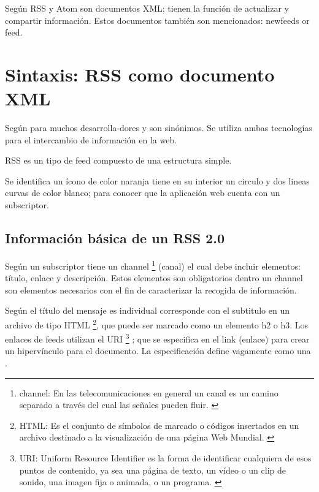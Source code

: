 Según \cite{wittenbrink2005rss} RSS y Atom son documentos XML; tienen la
función de actualizar y compartir información. Estos documentos también son
mencionados: newfeeds or feed. 

\section{Sintaxis: RSS como documento XML}

Según \cite{wittenbrink2005rss} para muchos desarrolla-dores
 y  son sinónimos. Se utiliza ambas
tecnologías para el intercambio de información en la web.

RSS es un tipo de feed compuesto de una estructura simple.

Se identifica un ícono de color naranja tiene en su interior un circulo 
y dos lineas curvas de color blanco; para conocer que la aplicación web 
cuenta con un subscriptor.

\begin{minipage}{1.0\linewidth}
	\centering
	\label{Ícono representación gráfica de un feed}
\end{minipage}

\subsection{Información básica de un RSS 2.0}

Según \cite{wittenbrink2005rss} un subscriptor tiene un channel
\footnote{channel: En las telecomunicaciones en general un canal es un camino
separado a través del cual las señales pueden fluir. \cite{channel}} (canal)
el cual debe incluir elementos: título, enlace y descripción. Estos elementos
son obligatorios dentro un channel son elementos necesarios con el fin de
caracterizar la recogida de información.

Según \cite{wittenbrink2005rss} el título del mensaje es individual
corresponde con el subtitulo en un archivo de tipo HTML \footnote{HTML: Es el
conjunto de símbolos de marcado o códigos insertados en un archivo destinado
a la visualización de una página Web Mundial. \cite{html}}, que puede ser
marcado como un elemento h2 o h3. Los enlaces de feeds utilizan el URI
\footnote{URI: Uniform Resource Identifier es la forma de identificar
cualquiera de esos puntos de contenido, ya sea una página de texto, un vídeo
o un clip de sonido, una imagen fija o animada, o un programa. \cite{uri}}
; que se especifica en el link (enlace) para crear un hipervínculo para el
documento. La especificación define vagamente como una .

